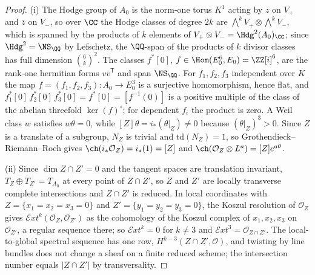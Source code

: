 \begin{proof}
(i) The Hodge group of $A_{0}$ is the norm-one torus $K^{1}$ acting by $z$ on $V_{+}$ and $\bar z$ on $V_{-}$, so over $\CC$ the Hodge classes of degree $2k$ are $\bigwedge^{k}V_{+}\otimes\bigwedge^{k}V_{-}$, which is spanned by the products of $k$ elements of $V_{+}\otimes V_{-}=\Hdg^{2}(A_{0})_{\CC}$; since $\Hdg^{2}=\NS_{\QQ}$ by Lefschetz, the $\QQ$-span of the products of $k$ divisor classes has full dimension $\binom{6}{k}^{2}$. The classes $f^{*}[0]$, $f\in\Hom(E_{0}^{6},E_{0})=\ZZ[i]^{6}$, are the rank-one hermitian forms $v\bar v^{\mathsf{T}}$ and span $\NS_{\QQ}$. For $f_{1},f_{2},f_{3}$ independent over $K$ the map $f=(f_{1},f_{2},f_{3})\colon A_{0}\to E_{0}^{3}$ is a surjective homomorphism, hence flat, and $f_{1}^{*}[0]\,f_{2}^{*}[0]\,f_{3}^{*}[0]=f^{*}[0]=[f^{-1}(0)]$ is a positive multiple of the class of the abelian threefold $\ker(f)^{\circ}$; for dependent $f_{i}$ the product is zero. A Weil class $w$ satisfies $w\theta=0$, while $[Z]\theta=i_{*}(\theta|_{Z})\ne0$ because $(\theta|_{Z})^{3}>0$. Since $Z$ is a translate of a subgroup, $N_{Z}$ is trivial and $\mathrm{td}(N_{Z})=1$, so Grothendieck--Riemann--Roch gives $\ch(i_{*}\mathcal{O}_{Z})=i_{*}(1)=[Z]$ and $\ch(\mathcal{O}_{Z}\otimes L^{a})=[Z]e^{a\theta}$.

(ii) Since $\dim Z\cap Z'=0$ and the tangent spaces are translation invariant, $T_{Z}\oplus T_{Z'}=T_{A_{0}}$ at every point of $Z\cap Z'$, so $Z$ and $Z'$ are locally transverse complete intersections and $Z\cap Z'$ is reduced. In local coordinates with $Z=\{x_{1}=x_{2}=x_{3}=0\}$ and $Z'=\{y_{1}=y_{2}=y_{3}=0\}$, the Koszul resolution of $\mathcal{O}_{Z}$ gives $\mathcal{E}xt^{k}(\mathcal{O}_{Z},\mathcal{O}_{Z'})$ as the cohomology of the Koszul complex of $x_{1},x_{2},x_{3}$ on $\mathcal{O}_{Z'}$, a regular sequence there; so $\mathcal{E}xt^{k}=0$ for $k\ne3$ and $\mathcal{E}xt^{3}=\mathcal{O}_{Z\cap Z'}$. The local-to-global spectral sequence has one row, $H^{k-3}(Z\cap Z',\mathcal{O})$, and twisting by line bundles does not change a sheaf on a finite reduced scheme; the intersection number equals $|Z\cap Z'|$ by transversality.


\end{proof}
